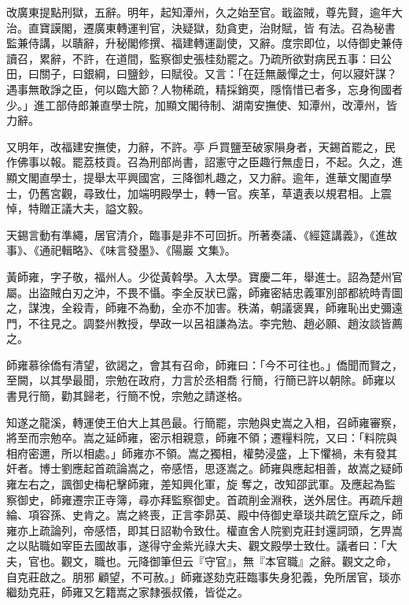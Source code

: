 \begin{pinyinscope}
 改廣東提點刑獄，五辭。明年，起知潭州，久之始至官。戢盜賊，尊先賢，逾年大治。直寶謨閣，遷廣東轉運判官，決疑獄，劾貪吏，治財賦，皆
 有法。召為秘書監兼侍講，以聵辭，升秘閣修撰、福建轉運副使，又辭。度宗即位，以侍御史兼侍讀召，累辭，不許，在道間，監察御史張桂劾罷之。乃疏所欲對病民五事：曰公田，曰關子，曰銀綱，曰鹽鈔，曰賦役。又言：「在廷無嚴憚之士，何以寢奸謀？遇事無敢諍之臣，何以臨大節？人物稀疏，精採銷耎，隱惰惜已者多，忘身徇國者少。」進工部侍郎兼直學士院，加顯文閣待制、湖南安撫使、知潭州，改潭州，皆力辭。



 又明年，改福建安撫使，力辭，不許。亭
 戶買鹽至破家隕身者，天錫首罷之，民作佛事以報。罷荔枝貢。召為刑部尚書，詔憲守之臣趣行無虛日，不起。久之，進顯文閣直學士，提舉太平興國宮，三降御札趣之，又力辭。逾年，進華文閣直學士，仍舊宮觀，尋致仕，加端明殿學士，轉一官。疾革，草遺表以規君相。上震悼，特贈正議大夫，謚文毅。



 天錫言動有準繩，居官清介，臨事是非不可回折。所著奏議、《經筵講義》，《進故事》、《通祀輯略》、《味言發墨》、《陽巖
 文集》。



 黃師雍，字子敬，福州人。少從黃斡學。入太學。寶慶二年，舉進士。詔為楚州官屬。出盜賊白刃之沖，不畏不懾。李全反狀已露，師雍密結忠義軍別部都統時青圖之，謀洩，全殺青，師雍不為動，全亦不加害。秩滿，朝議褒異，師雍恥出史彌遠門，不往見之。調婺州教授，學政一以呂祖謙為法。李完勉、趙必願、趙汝談皆薦之。



 師雍慕徐僑有清望，欲謁之，會其有召命，師雍曰：「今不可往也。」僑聞而賢之，至闕，以其學最聞，宗勉在政府，力言於丞相喬
 行簡，行簡已許以朝除。師雍以書見行簡，勸其歸老，行簡不悅，宗勉之請遂格。



 知遂之龍溪，轉運使王伯大上其邑最。行簡罷，宗勉與史嵩之入相，召師雍審察，將至而宗勉卒。嵩之延師雍，密示相親意，師雍不領；遷糧料院，又曰：「料院與相府密邇，所以相處。」師雍亦不領。嵩之獨相，權勢浸盛，上下懼禍，未有發其奸者。博士劉應起首疏論嵩之，帝感悟，思逐嵩之。師雍與應起相善，故嵩之疑師雍左右之，諷御史梅杞擊師雍，差知興化軍，旋
 奪之，改知邵武軍。及應起為監察御史，師雍遷宗正寺簿，尋亦拜監察御史。首疏削金淵秩，送外居住。再疏斥趙綸、項容孫、史肯之。嵩之終喪，正言李昴英、殿中侍御史章琰共疏乞竄斥之，師雍亦上疏論列，帝感悟，即其日詔勒令致仕。權直舍人院劉克莊封還詞頭，乞畀嵩之以貼職如宰臣去國故事，遂得守金紫光祿大夫、觀文殿學士致仕。議者曰：「大夫，官也。觀文，職也。元降御筆但云『守官』，無『本官職』之辭。觀文之命，自克莊啟之。朋邪
 顧望，不可赦。」師雍遂劾克莊臨事失身犯義，免所居官，琰亦繼劾克莊，師雍又乞籍嵩之家隸張叔儀，皆從之。




\end{pinyinscope}
